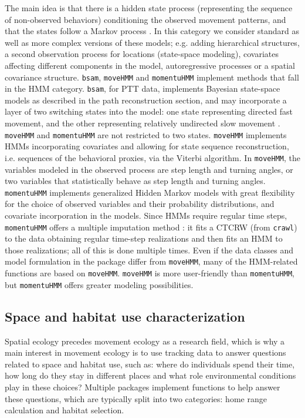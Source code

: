 \documentclass[a4paper,12pt]{article}
\newcommand{\Rpkg}[1]{\texttt{#1}}
\begin{document}
	The main idea is that there is a hidden state process (representing the sequence of non-observed behaviors) conditioning the observed movement patterns, and that the states follow a Markov process \citep{Langrock2012}. In this category we consider standard as well as more complex versions of these models; e.g. adding hierarchical structures, a second observation process for locations (state-space modeling), covariates affecting different components in the model, autoregressive processes or a spatial covariance structure. \Rpkg{bsam}, \Rpkg{moveHMM} and \Rpkg{momentuHMM} implement methods that fall in the HMM category. \Rpkg{bsam}, for PTT data, implements Bayesian state-space models as described in the path reconstruction section, and may incorporate a layer of two switching states into the model: one state representing directed fast movement, and the other representing relatively undirected slow movement \citep{Jonsen2013}. \Rpkg{moveHMM} and \Rpkg{momentuHMM} are not restricted to two states. \Rpkg{moveHMM} implements HMMs incorporating covariates and allowing for state sequence reconstruction, i.e. sequences of the behavioral proxies, via the Viterbi algorithm. In \Rpkg{moveHMM}, the variables modeled in the observed process are step length and turning angles, or two variables that statistically behave as step length and turning angles. \Rpkg{momentuHMM} implements generalized Hidden Markov models \citep{McClintock2012} with great flexibility for the choice of observed variables and their probability distributions, and covariate incorporation in the models. Since HMMs require regular time steps, \Rpkg{momentuHMM} offers a multiple imputation method \citep{McClintock2017}: it fits a CTCRW (from \Rpkg{crawl}) to the data obtaining regular time-step realizations and then fits an HMM to those realizations; all of this is done multiple times. Even if the data classes and model formulation in the package differ from \Rpkg{moveHMM}, many of the HMM-related functions are based on \Rpkg{moveHMM}. \Rpkg{moveHMM} is more user-friendly than \Rpkg{momentuHMM}, but \Rpkg{momentuHMM} offers greater modeling possibilities. 
	
	\subsection*{Space and habitat use characterization}
	
	Spatial ecology precedes movement ecology as a research field, which is why a main interest in movement ecology is to use tracking data to answer questions related to space and habitat use, such as: where do individuals spend their time, how long do they stay in different places and what role environmental conditions play in these choices? Multiple packages implement functions to help answer these questions, which are typically split into two categories: home range calculation and habitat selection.
	
\end{document}
